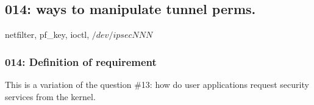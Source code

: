 \subsection{014: ways to manipulate tunnel perms.}

netfilter, pf\_key, ioctl, $/dev/ipsecNNN$ 

\subsubsection{014: Definition of requirement }

This is a variation of the question \#13: how do user applications request
security services from the kernel. 





